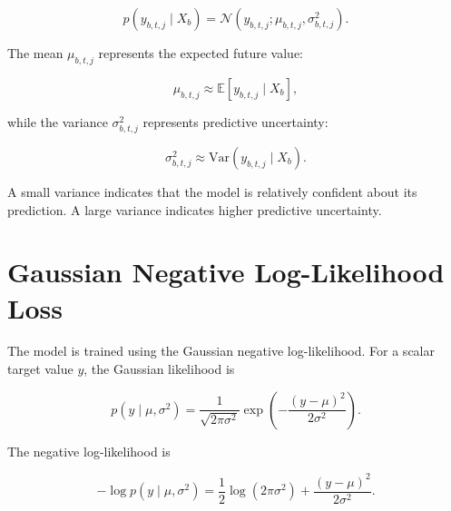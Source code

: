 \documentclass[a4paper]{article}
\begin{document}
        \[
            p
            \left(
                y_{b,t,j}
                \mid
                X_b
            \right)
            =
            \mathcal{N}
            \left(
                y_{b,t,j};
                \mu_{b,t,j},
                \sigma^2_{b,t,j}
            \right).
        \]
        
        The mean \(\mu_{b,t,j}\) represents the expected future value:
        
        \[
            \mu_{b,t,j}
            \approx
            \mathbb{E}
            \left[
                y_{b,t,j}
                \mid
                X_b
            \right],
        \]
        
        while the variance \(\sigma^2_{b,t,j}\) represents predictive uncertainty:
        
        \[
            \sigma^2_{b,t,j}
            \approx
            \mathrm{Var}
            \left(
                y_{b,t,j}
                \mid
                X_b
            \right).
        \]
        
        A small variance indicates that the model is relatively confident about its prediction. A large variance indicates higher predictive uncertainty.
    
    
    \section{Gaussian Negative Log-Likelihood Loss}
        
        The model is trained using the Gaussian negative log-likelihood. For a scalar target value \(y\), the Gaussian likelihood is
        
        \[
            p
            \left(
                y
                \mid
                \mu,
                \sigma^2
            \right)
            =
            \frac{
                1
            }{
                \sqrt{
                    2\pi\sigma^2
                }
            }
            \exp
            \left(
                -
                \frac{
                    \left(
                        y
                        -
                        \mu
                    \right)^2
                }{
                    2\sigma^2
                }
            \right).
        \]
        
        The negative log-likelihood is
        
        \[
            -
            \log
            p
            \left(
                y
                \mid
                \mu,
                \sigma^2
            \right)
            =
            \frac{1}{2}
            \log
            \left(
                2\pi\sigma^2
            \right)
            +
            \frac{
                \left(
                    y
                    -
                    \mu
                \right)^2
            }{
                2\sigma^2
            }.
        \]
        
\end{document}

